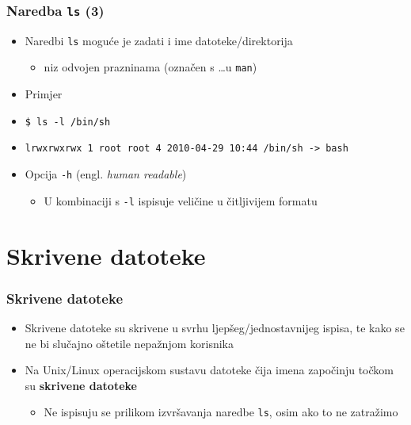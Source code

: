 \documentclass{beamer}
\begin{document}
\begin{frame}[t]
\frametitle{Naredba \texttt{ls} (3)}
\begin{itemize}
  \item Naredbi \texttt{ls} moguće je zadati i ime datoteke/direktorija
  \begin{itemize}
    \item niz odvojen prazninama (označen s \ldots u \texttt{man})
  \end{itemize}
  \item Primjer
  \item[] \small\texttt{\$ ls -l /bin/sh}
  \item[] \small\texttt{lrwxrwxrwx 1 root root 4 2010-04-29 10:44 /bin/sh
                        -> bash}
  \item Opcija \texttt{-h} (engl. \emph{human readable})
  \begin{itemize}
    \item U kombinaciji s \texttt{-l} ispisuje veličine u čitljivijem
          formatu
  \end{itemize}
\end{itemize}
\end{frame}

\section{Skrivene datoteke}
\begin{frame}[t]
\frametitle{Skrivene datoteke}
\begin{itemize}
  \item Skrivene datoteke su skrivene u svrhu ljepšeg/jednostavnijeg ispisa, te kako se ne bi slučajno oštetile nepažnjom korisnika
  \item Na Unix/Linux operacijskom sustavu datoteke čija imena započinju
        točkom su \textbf{skrivene datoteke}
  \begin{itemize}
    \item Ne ispisuju se prilikom izvršavanja naredbe \texttt{ls}, osim
          ako to ne zatražimo
  \end{itemize}
\end{itemize}
\end{frame}
\end{document}
